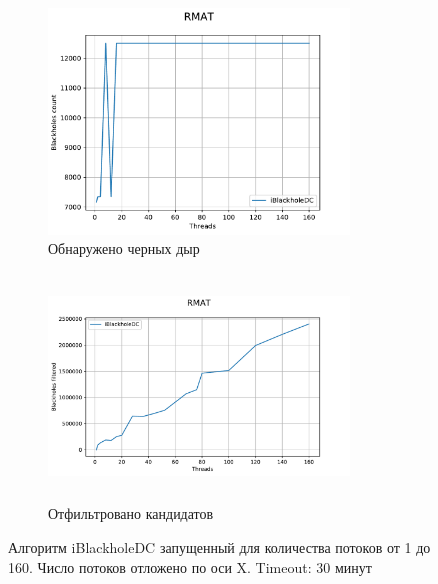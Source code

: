\documentclass[12pt,a4paper,oneside,openany]{article}
\theoremstyle{definition}
\theoremstyle{lemma}
\theoremstyle{remark}
\begin{document}
\begin{figure}[H]
    \begin{subfigure}{.5\textwidth}
      \centering
      \includegraphics[width=8cm]{images/5_count.pdf}
      \caption{Обнаружено черных дыр}
      \label{fig:chinesemany:count}
    \end{subfigure}
    \begin{subfigure}{.5\textwidth}
      \centering
      \includegraphics[width=8cm,height=6cm]{images/5_filtered.pdf}
      \caption{Отфильтровано кандидатов}
      \label{fig:chinesemany:filtered}
    \end{subfigure}
    \caption{Алгоритм iBlackholeDC запущенный для количества потоков от 1 до 160. Число потоков отложено по оси X. Timeout: 30 минут}
    \label{fig:chinesemany}
\end{figure}
\end{document}
